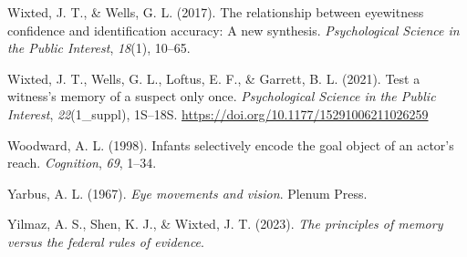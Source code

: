 \documentclass[
]{krantz}
\newlength{\cslhangindent}
\newenvironment{CSLReferences}[2] %
 {\begin{list}{}{%
  \setlength{\itemindent}{0pt}
  \setlength{\leftmargin}{0pt}
  \setlength{\parsep}{0pt}
  \ifodd #1
   \setlength{\leftmargin}{\cslhangindent}
   \setlength{\itemindent}{-1\cslhangindent}
  \fi
  \setlength{\itemsep}{#2\baselineskip}}}
 {\end{list}}
\begin{document}
\begin{CSLReferences}{1}{0}
Wixted, J. T., \& Wells, G. L. (2017). The relationship between eyewitness confidence and identification accuracy: A new synthesis. \emph{Psychological Science in the Public Interest}, \emph{18}(1), 10--65.

Wixted, J. T., Wells, G. L., Loftus, E. F., \& Garrett, B. L. (2021). Test a witness's memory of a suspect only once. \emph{Psychological Science in the Public Interest}, \emph{22}(1\_suppl), 1S--18S. \url{https://doi.org/10.1177/15291006211026259}

Woodward, A. L. (1998). Infants selectively encode the goal object of an actor's reach. \emph{Cognition}, \emph{69}, 1--34.

Yarbus, A. L. (1967). \emph{Eye movements and vision}. Plenum Press.

Yilmaz, A. S., Shen, K. J., \& Wixted, J. T. (2023). \emph{The principles of memory versus the federal rules of evidence}.

\end{CSLReferences}
\end{document}
